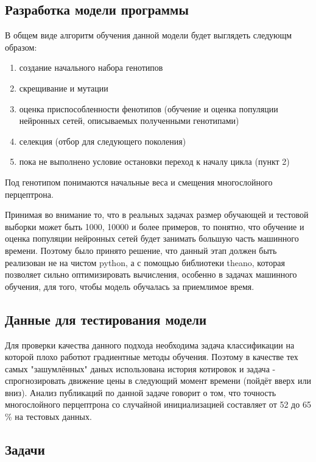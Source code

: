 \documentclass[a4paper,12pt]{article}
\begin{document}
\subsection{Разработка модели программы}
В общем виде алгоритм обучения данной модели будет выглядеть следующм образом:
\begin{enumerate}
\item создание начального набора генотипов
\item скрещивание и мутации
\item оценка приспособленности фенотипов (обучение и оценка популяции нейронных сетей, описываемых полученными генотипами)
\item селекция (отбор для следующего поколения)
\item пока не выполнено условие остановки переход к началу цикла (пункт 2)
\end{enumerate}
Под генотипом понимаются начальные веса и смещения многослойного перцептрона.

\par Принимая во внимание то, что в реальных задачах размер обучающей и тестовой выборки может быть 1000, 10000 и более примеров, то понятно, что обучение и оценка популяции нейронных сетей будет занимать большую часть машинного времени. Поэтому было принято решение, что данный этап должен быть реализован не на чистом python, а с помощью библиотеки theano, которая позволяет сильно оптимизировать вычисления, особенно в задачах машинного обучения, для того, чтобы модель обучалась за приемлимое время.

\subsection{Данные для тестирования модели}

\par Для проверки качества данного подхода необходима задача классификации на которой плохо работют градиентные методы обучения. Поэтому в качестве тех самых "зашумлённых" даных использована история котировок и задача - спрогнозировать движение цены в следующий момент времени (пойдёт вверх или вниз). Анализ публикаций по данной задаче говорит о том, что точность многослойного перцептрона со случайной инициализацией составляет от 52 до 65 \% на тестовых данных.

\subsection{Задачи}
\end{document}
